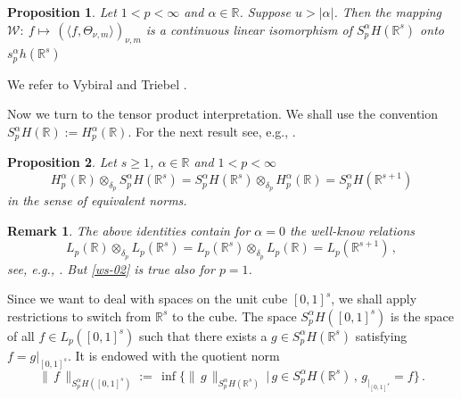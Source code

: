 \documentclass[12pt]{article}
\newtheorem{proposition}{Proposition}
\newtheorem{remark}{Remark}
\newcommand{\real}{\mathbb{R}}
\newcommand{\red}[1]{\textcolor{red}{#1}}
\begin{document}
\begin{proposition}\label{waveBesovS}
Let $1 <p< \infty$ and $\alpha \in \real$. Suppose $ u> |\alpha|$.
Then the mapping $\mathcal{W}:~ f \mapsto \, (\langle f, \Theta_{\nu,m} \rangle)_{\nu,m}$
is a continuous linear isomorphism of $S^\alpha_p H(\real^s)$ onto $s^\alpha_p h(\real^s)$
\end{proposition}

We refer to Vybiral \cite{Vy} and Triebel \cite[Thm.~1.54]{Tri10}.



Now we turn to the tensor product interpretation.
We shall use the convention $S^{\alpha}_{p}H(\real):= H^{\alpha}_{p}(\real)$.
For the next result see, e.g., \cite{SU1, SU2}. %

\begin{proposition}\label{tensorb} 
Let $s\ge 1$, $\alpha \in \real$ and $1<p<\infty$
 \begin{equation*}\label{eq-5}
    \nonumber H^\alpha_p(\real) \otimes_{\delta_p} S^\alpha_pH(\real^s) = S^\alpha_pH(\real^s) \otimes_{\delta_p} H^\alpha_p(\real) = \nonumber S^\alpha_pH(\real^{s+1})
 \end{equation*}
in the sense of equivalent norms.
\end{proposition}

\begin{remark}\label{Lebesgue}
The above identities contain for $\alpha =0$  the well-know relations
\begin{equation}\label{ws-02}
 L_p (\real)\otimes_{\delta_p} L_p (\real^s) 
= L_p (\real^s)\otimes_{\delta_p} L_p (\real) 
= L_p (\real^{s+1})\, ,
\end{equation}
see, e.g., \cite{LiCh}. But \eqref{ws-02} is true also for $p=1$.
\end{remark}

Since we want to deal with spaces on the unit cube $[0,1]^{s}$, 
we shall apply restrictions  to switch from $\real^{s}$  to the cube.  
The space
$S^{\alpha}_{p}H([0,1]^s)$ is the space of all $f\in
   L_p([0,1]^s)$ such that there exists a $g\in
   S^{\alpha}_{p}H(\real^s)$ satisfying $f = g|_{[0,1]^s}$. It is endowed  with the quotient norm
   $$
 \|\,f\,\|_{S^{\alpha}_{p}H([0,1]^s)} := \, \inf\{\|\, g \,\|_{S^{\alpha}_{p}H(\real^s)} \,|\, g\in S^{\alpha}_{p}H(\real^s)\,,\, g_{|_{[0,1]^s}} =f\}\,.
   $$
\end{document}
